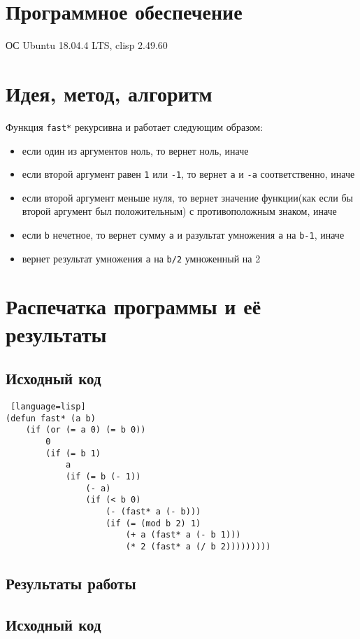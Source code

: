\documentclass[12pt]{article}
\begin{document}
\section{Программное обеспечение}
ОС Ubuntu 18.04.4 LTS, clisp 2.49.60

\section{Идея, метод, алгоритм}
Функция {\tt fast*} рекурсивна и работает следующим образом:
\begin{itemize}
\setlength{\itemsep}{-1mm} %
\item если один из аргументов ноль, то вернет ноль, иначе
\item если второй аргумент равен {\tt 1} или {\tt -1}, то вернет {\tt a} и {\tt -a} соответственно, иначе
\item если второй аргумент меньше нуля, то вернет значение функции(как если бы второй аргумент был положительным) с противоположным знаком, иначе
\item если {\tt b} нечетное, то вернет  сумму {\tt a} и разультат умножения {\tt a} на {\tt b-1}, иначе
\item вернет результат умножения {\tt a} на {\tt b/2} умноженный на 2 
\end{itemize}

\section{Распечатка программы и её результаты}
\subsection{Исходный код}
\begin{lstlisting} [language=lisp]
(defun fast* (a b)
    (if (or (= a 0) (= b 0))
        0
        (if (= b 1)
            a
            (if (= b (- 1))
                (- a)
                (if (< b 0)
                    (- (fast* a (- b)))
                    (if (= (mod b 2) 1)
                        (+ a (fast* a (- b 1)))
                        (* 2 (fast* a (/ b 2)))))))))
\end{lstlisting}

\subsection{Результаты работы}
\subsection{Исходный код}
\end{document}
